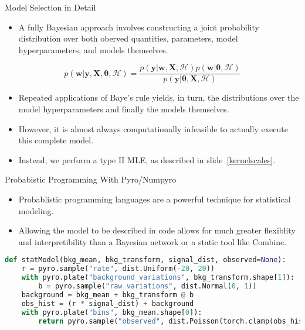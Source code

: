 \documentclass[10pt]{beamer}
\begin{document}
\begin{frame}{Model Selection in Detail}
  \begin{itemize}
  \item A fully Bayesian approach involves constructing a joint probability distribution over both oberved quantities, parameters, model hyperparameters, and models themselves.
  \end{itemize}
  \begin{equation}
    \label{eq:1}
    p \left( \bm{w} | \bm{y}, \bm{X}, \bm{\theta}, \mathcal{H} \right)
    = \frac{p \left( \bm{y} | \bm{w}, \bm{X}, \mathcal{H} \right) p \left( \bm{w} | \bm{\theta}, \mathcal{H} \right) }
    {p \left( \bm{y} | \bm{\theta},\bm{X}, \mathcal{H} \right) }
  \end{equation}
  \begin{itemize}
  \item Repeated applications of Baye's rule yields, in turn, the distributions over the model hyperparameters and finally the models themselves.
  \item However, it is almost always computationally infeasible to actually execute this complete model. 
  \item Instead, we perform a type II MLE, as described in slide~\ref{kernelscales}.
  \end{itemize}
\end{frame}

\begin{frame}[fragile]{Probabistic Programming With Pyro/Numpyro}
  \begin{itemize}
  \item Probablistic programming languages are a powerful technique for statistical modeling.
  \item Allowing the model to be described in code allows for much greater flexiblity and interpretibility than a Bayesian network or a static tool like Combine.
  \end{itemize}

  \begin{center}
\begin{lstlisting}[language=Python,
    basicstyle=\ttfamily\scriptsize,
]
def statModel(bkg_mean, bkg_transform, signal_dist, observed=None):
    r = pyro.sample("rate", dist.Uniform(-20, 20))
    with pyro.plate("background_variations", bkg_transform.shape[1]):
        b = pyro.sample("raw_variations", dist.Normal(0, 1))
    background = bkg_mean + bkg_transform @ b
    obs_hist = (r * signal_dist) + background
    with pyro.plate("bins", bkg_mean.shape[0]):
        return pyro.sample("observed", dist.Poisson(torch.clamp(obs_hist, 1)), obs=observed)
\end{lstlisting}
  \end{center}
\end{frame}
\end{document}
